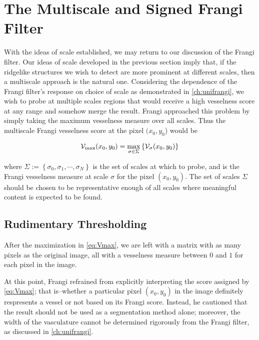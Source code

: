  \chapter{The Multiscale and Signed Frangi Filter} \label{ch:multifrangi}
    
     With the ideas of scale established, we may return to our discussion of the Frangi filter.
    Our ideas of scale developed in the previous section imply that, if the ridgelike structures we wish to detect are more prominent at different scales, then a multiscale approach is the natural one. Considering the dependence of the Frangi filter's response on choice of scale as demonstrated in \cref{ch:unifrangi}, we wish to probe at multiple scales
    regions that would receive a high vesselness score at any range and somehow merge the result. Frangi \cite{frangi-paper} approached this problem by simply taking the maximum vesselness measure over all scales. Thus the multiscale Frangi vesselness score at the pixel $(x_0, y_0$) would be 
    
    \begin{equation} \label{eq:Vmax}
    \mathcal{V}_{\max}(x_0, y_0) =
    	\underset{\sigma \in \Sigma}{\max}\left\{  \mathcal{V}_{\sigma} (x_0, y_0) \right\}
    \end{equation}
    
    where $\Sigma := \left\{ \sigma_0, \sigma_1 , \cdots, \sigma_N \right\}$ is
    the set of scales at which to probe, and \Vsigma is the Frangi vesselness measure at scale $\sigma$ for the pixel $(x_0,y_0)$. The set of scales $\Sigma$ should be chosen to be representative enough of all scales where meaningful content is expected to be found.
    
   
    \section{Rudimentary Thresholding}
    
    After the maximization in \cref{eq:Vmax}, we are left with a matrix with as many pixels as the original image, all with a vesselness measure between $0$ and $1$ for each pixel in the image.
         
    At this point, Frangi \cite{frangi-paper} refrained from explicitly interpreting the score assigned by \cref{eq:Vmax}; that is--whether a particular pixel $(x_0,y_0)$ in the image definitely respresents a vessel or not based on its Frangi score. Instead, he cautioned that the result should not be used as a segmentation method alone; moreover, the width of the vasculature cannot be determined rigorously from the Frangi filter, as discussed in \cref{ch:unifrangi}.
   
